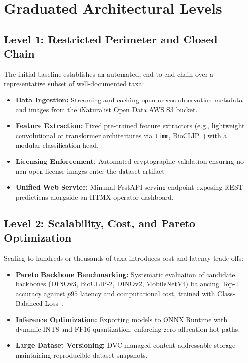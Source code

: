\documentclass[11pt,a4paper]{article}
\begin{document}
\section{Graduated Architectural Levels}

\subsection{Level 1: Restricted Perimeter and Closed Chain}
The initial baseline establishes an automated, end-to-end chain over a representative subset of well-documented taxa:
\begin{itemize}
    \item \textbf{Data Ingestion:} Streaming and caching open-access observation metadata and images from the iNaturalist Open Data AWS S3 bucket.
    \item \textbf{Feature Extraction:} Fixed pre-trained feature extractors (e.g., lightweight convolutional or transformer architectures via \texttt{timm}, BioCLIP~\cite{stevens2024bioclip}) with a modular classification head.
    \item \textbf{Licensing Enforcement:} Automated cryptographic validation ensuring no non-open license images enter the dataset artifact.
    \item \textbf{Unified Web Service:} Minimal FastAPI serving endpoint exposing REST predictions alongside an HTMX operator dashboard.
\end{itemize}

\subsection{Level 2: Scalability, Cost, and Pareto Optimization}
Scaling to hundreds or thousands of taxa introduces cost and latency trade-offs:
\begin{itemize}
    \item \textbf{Pareto Backbone Benchmarking:} Systematic evaluation of candidate backbones (DINOv3, BioCLIP-2, DINOv2, MobileNetV4) balancing Top-1 accuracy against $p95$ latency and computational cost, trained with Class-Balanced Loss~\cite{cui2019classbalanced}.
    \item \textbf{Inference Optimization:} Exporting models to ONNX Runtime with dynamic INT8 and FP16 quantization, enforcing zero-allocation hot paths.
    \item \textbf{Large Dataset Versioning:} DVC-managed content-addressable storage maintaining reproducible dataset snapshots.
\end{itemize}
\end{document}
